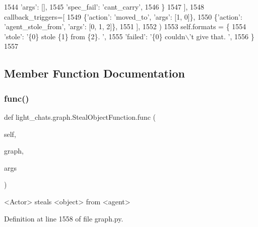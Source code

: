 \begin{DoxyCode}
1544                     \textcolor{stringliteral}{'args'}: [],
1545                     \textcolor{stringliteral}{'spec\_fail'}: \textcolor{stringliteral}{'cant\_carry'},
1546                 \}
1547             ],
1548             callback\_triggers=[
1549                 \{\textcolor{stringliteral}{'action'}: \textcolor{stringliteral}{'moved\_to'}, \textcolor{stringliteral}{'args'}: [1, 0]\},
1550                 \{\textcolor{stringliteral}{'action'}: \textcolor{stringliteral}{'agent\_stole\_from'}, \textcolor{stringliteral}{'args'}: [0, 1, 2]\},
1551             ],
1552         )
1553         self.formats = \{
1554             \textcolor{stringliteral}{'stole'}: \textcolor{stringliteral}{'\{0\} stole \{1\} from \{2\}. '},
1555             \textcolor{stringliteral}{'failed'}: \textcolor{stringliteral}{'\{0\} couldn\(\backslash\)'t give that. '},
1556         \}
1557 
\end{DoxyCode}


\subsection{Member Function Documentation}
\mbox{\label{classlight__chats_1_1graph_1_1StealObjectFunction_a229fafa57d40e38da54a4b04947e2fe0}} 
\subsubsection{\texorpdfstring{func()}{func()}}
{\footnotesize\ttfamily def light\+\_\+chats.\+graph.\+Steal\+Object\+Function.\+func (\begin{DoxyParamCaption}\item[{}]{self,  }\item[{}]{graph,  }\item[{}]{args }\end{DoxyParamCaption})}

\begin{DoxyVerb}<Actor> steals <object> from <agent>
\end{DoxyVerb}
 

Definition at line 1558 of file graph.\+py.


